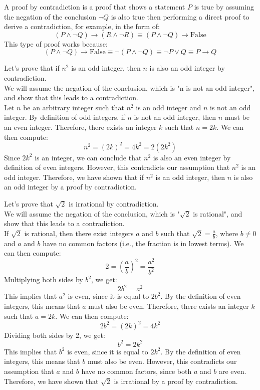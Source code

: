 \begin{definition}
    A proof by contradiction is a proof that shows a statement $P$ is true by assuming the negation of the conclusion $\neg Q$ is also true then performing a direct proof to derive a contradiction, for example, in the form of:
    \[
        (P \land \neg Q) \to (R \land \neg R) \equiv (P \land \neg Q) \to \text{False}
    \]
    This type of proof works because:
    \[
        (P \land \neg Q) \to \text{False} \equiv \neg (P \land \neg Q) \equiv \neg P \lor Q \equiv P \to Q
    \]
\end{definition}

\begin{eg}
    Let's prove that if $n^2$ is an odd integer, then $n$ is also an odd integer by contradiction. \\
    We will assume the negation of the conclusion, which is "n is not an odd integer", and show that this leads to a contradiction. \\
    Let $n$ be an arbitrary integer such that $n^2$ is an odd integer and $n$ is not an odd integer. By definition of odd integers, if $n$ is not an odd integer, then $n$ must be an even integer. Therefore, there exists an integer $k$ such that $n = 2k$. We can then compute:
    \[
        n^2 = (2k)^2 = 4k^2 = 2(2k^2)
    \]
    Since $2k^2$ is an integer, we can conclude that $n^2$ is also an even integer by definition of even integers. However, this contradicts our assumption that $n^2$ is an odd integer. Therefore, we have shown that if $n^2$ is an odd integer, then $n$ is also an odd integer by a proof by contradiction.
\end{eg}

\begin{eg}
    Let's prove that $\sqrt{2}$ is irrational by contradiction. \\
    We will assume the negation of the conclusion, which is "$\sqrt{2}$ is rational", and show that this leads to a contradiction. \\
    If $\sqrt{2}$ is rational, then there exist integers $a$ and $b$ such that $\sqrt{2} = \frac{a}{b}$, where $b \neq 0$ and $a$ and $b$ have no common factors (i.e., the fraction is in lowest terms). We can then compute:
    \[
        2 = \left(\frac{a}{b}\right)^2 = \frac{a^2}{b^2}
    \]
    Multiplying both sides by $b^2$, we get:
    \[
        2b^2 = a^2
    \]
    This implies that $a^2$ is even, since it is equal to $2b^2$. By the definition of even integers, this means that $a$ must also be even. Therefore, there exists an integer $k$ such that $a = 2k$. We can then compute:
    \[
        2b^2 = (2k)^2 = 4k^2
    \]
    Dividing both sides by 2, we get:
    \[
        b^2 = 2k^2
    \]
    This implies that $b^2$ is even, since it is equal to $2k^2$. By the definition of even integers, this means that $b$ must also be even. However, this contradicts our assumption that $a$ and $b$ have no common factors, since both $a$ and $b$ are even. Therefore, we have shown that $\sqrt{2}$ is irrational by a proof by contradiction.
\end{eg}

